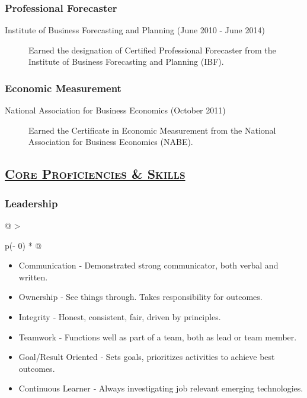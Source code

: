 \documentclass[
  letterpaper,
  DIV=11,
  numbers=noendperiod]{scrartcl}
\providecommand{\tightlist}{%
  \setlength{\itemsep}{0pt}\setlength{\parskip}{0pt}}\usepackage{longtable,booktabs,array}
\begin{document}
\hypertarget{professional-forecaster}{%
\subsubsection{Professional Forecaster}\label{professional-forecaster}}

\begin{description}
\item[Institute of Business Forecasting and Planning (June 2010 - June
2014)]
Earned the designation of Certified Professional Forecaster from the
Institute of Business Forecasting and Planning (IBF).
\end{description}

\hypertarget{economic-measurement}{%
\subsubsection{Economic Measurement}\label{economic-measurement}}

\begin{description}
\item[National Association for Business Economics (October 2011)]
Earned the Certificate in Economic Measurement from the National
Association for Business Economics (NABE).
\end{description}

\hypertarget{core-proficiencies-skills}{%
\subsection{\texorpdfstring{\textsc{\ul{Core Proficiencies \&
Skills}}}{Core Proficiencies \& Skills}}\label{core-proficiencies-skills}}

\hypertarget{leadership}{%
\subsubsection{Leadership}\label{leadership}}

\begin{longtable}[]{@{}
  >{\raggedright\arraybackslash}p{(\columnwidth - 0\tabcolsep) * }@{}}
\toprule\noalign{}
\endhead
\bottomrule\noalign{}
\endlastfoot
\begin{minipage}[t]{\linewidth}\raggedright
\begin{itemize}
\tightlist
\item
  Communication ‐ Demonstrated strong communicator, both verbal and
  written.
\item
  Ownership ‐ See things through. Takes responsibility for outcomes.
\item
  Integrity ‐ Honest, consistent, fair, driven by principles.
\item
  Teamwork ‐ Functions well as part of a team, both as lead or team
  member.
\item
  Goal/Result Oriented ‐ Sets goals, prioritizes activities to achieve
  best outcomes.
\item
  Continuous Learner ‐ Always investigating job relevant emerging
  technologies.
\end{itemize}
\end{minipage} \\
\end{longtable}
\end{document}
